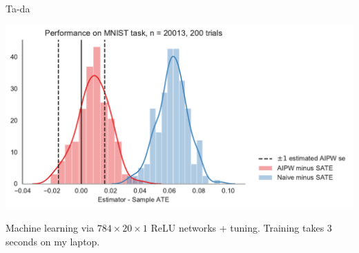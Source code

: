 \documentclass[10pt,aspectratio=169,handout]{beamer}
\theoremstyle{definition}
\begin{document}
\begin{frame}{Ta-da}
  \begin{center}
    \includegraphics[height=.8\textheight]{mnist.pdf}
  \end{center}
  \scriptsize
  Machine learning via $784 \times 20 \times 1$ ReLU networks + tuning.
  Training takes 3 seconds on my laptop.
\end{frame}


% 
% 
\end{document}
